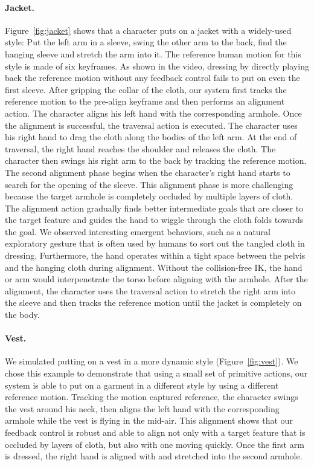 \paragraph{Jacket.} Figure~\ref{fig:jacket} shows that a character puts on a jacket with a widely-used style: Put the left arm in a sleeve, swing the other arm to the back, find the hanging sleeve and stretch the arm into it. The reference human motion for this style is made of six keyframes. As shown in the video, dressing by directly playing back the reference motion without any feedback control fails to put on even the first sleeve. After gripping the collar of the cloth, our system first tracks the reference motion to the pre-align keyframe and then performs an alignment action. The character aligns his left hand with the corresponding armhole. Once the alignment is successful, the traversal action is executed. The character uses his right hand to drag the cloth along the bodies of the left arm. At the end of traversal, the right hand reaches the shoulder and releases the cloth. The character then swings his right arm to the back by tracking the reference motion. The second alignment phase begins when the character's right hand starts to search for the opening of the sleeve. This alignment phase is more challenging because the target armhole is completely occluded by multiple layers of cloth. The alignment action gradually finds better intermediate goals that are closer to the target feature and guides the hand to wiggle through the cloth folds towards the goal. We observed interesting emergent behaviors, such as a natural exploratory gesture that is often used by humans to sort out the tangled cloth in dressing. Furthermore, the hand operates within a tight space between the pelvis and the hanging cloth during alignment. Without the collision-free IK, the hand or arm would interpenetrate the torso before aligning with the armhole. After the alignment, the character uses the traversal action to stretch the right arm into the sleeve and then tracks the reference motion until the jacket is completely on the body.

\paragraph{Vest.} We simulated putting on a vest in a more dynamic style (Figure~\ref{fig:vest}). We chose this example to demonstrate that using a small set of primitive actions, our system is able to put on a garment in a different style by using a different reference motion. Tracking the motion captured reference, the character swings the vest around his neck, then aligns the left hand with the corresponding armhole while the vest is flying in the mid-air. This alignment shows that our feedback control is robust and able to align not only with a target feature that is occluded by layers of cloth, but also with one moving quickly. Once the first arm is dressed, the right hand is aligned with and stretched into the second armhole. 

